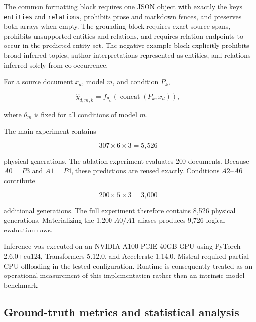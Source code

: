 \documentclass[fleqn,10pt]{wlscirep-authoryear}
\begin{document}
The common formatting block requires one JSON object with exactly the keys
\texttt{entities} and \texttt{relations}, prohibits prose and markdown fences,
and preserves both arrays when empty. The grounding block requires exact source
spans, prohibits unsupported entities and relations, and requires relation
endpoints to occur in the predicted entity set. The negative-example block
explicitly prohibits broad inferred topics, author interpretations represented as
entities, and relations inferred solely from co-occurrence.

For a source document $x_d$, model $m$, and condition $P_k$,

\begin{equation}
\hat{y}_{d,m,k}
=
f_{\theta_m}
\left(
\operatorname{concat}(P_k,x_d)
\right),
\end{equation}

where $\theta_m$ is fixed for all conditions of model $m$.

The main experiment contains

\begin{equation}
307 \times 6 \times 3
=
5{,}526
\end{equation}

physical generations. The ablation experiment evaluates 200 documents. Because
$A0=P3$ and $A1=P4$, these predictions are reused exactly. Conditions
$A2$--$A6$ contribute

\begin{equation}
200\times5\times3
=
3{,}000
\end{equation}

additional generations. The full experiment therefore contains 8,526 physical
generations. Materializing the 1,200 $A0/A1$ aliases produces 9,726 logical
evaluation rows.

Inference was executed on an NVIDIA A100-PCIE-40GB GPU using PyTorch
2.6.0+cu124, Transformers 5.12.0, and Accelerate 1.14.0. Mistral required partial
CPU offloading in the tested configuration. Runtime is consequently treated as an
operational measurement of this implementation rather than an intrinsic model
benchmark.


\subsection{Ground-truth metrics and statistical analysis}
\label{sec:evaluation}
\end{document}
